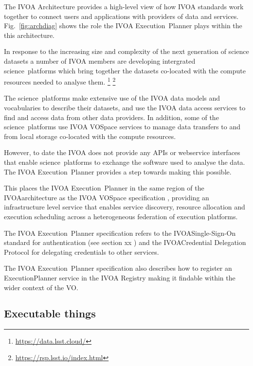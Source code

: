 \documentclass[11pt,a4paper]{ivoa}
\newcommand{\webservice} {webservice}
\newcommand{\ivoa} {IVOA}
\newcommand{\vospace} {VOSpace}
\newcommand{\execplanner} {ExecutionPlanner}
\newcommand{\executionplanner} {Execution~Planner}
\newcommand{\footurl}[1] {\footnote{\url{#1}}}
\newcommand{\dataset} {dataset}
\newcommand{\scienceplatform} {science~platform}
\begin{document}
The IVOA Architecture \citep{2010ivoa.rept.1123A} provides a high-level view of how IVOA
standards work together to connect users and applications with providers of data
and services.
Fig.~\ref{fig:archdiag} shows the role the \ivoa{} \executionplanner{} plays within the this architecture.

In response to the increasing size and complexity of the next generation of science \dataset{}s
a number of \ivoa{} members are developing intergrated \scienceplatform{}s which bring
together the \dataset{}s co-located with the compute resources needed to analyse them.
\footurl{https://data.lsst.cloud/}
\footurl{https://rsp.lsst.io/index.html}

The \scienceplatform{}s make extensive use of the \ivoa{} data models and
vocabularies to describe their \dataset{}s, and use the \ivoa{} data access
services to find and access data from other data providers.
In addition, some of the \scienceplatform{}s use \ivoa{} \vospace{} services to manage
data transfers to and from local storage co-located with the compute resources.

However, to date the \ivoa{} does not provide any APIs or \webservice{} interfaces that
enable \scienceplatform{}s to exchange the software used to analyse the data.
The \ivoa{} \executionplanner{} provides a step towards making this possible.

This places the \ivoa{} \executionplanner{} in the same region of the \ivoa architecture
as the \ivoa{} \vospace{} specification \citep{2009ivoa.specQ1007G},
providing an infrastructure level service that enables service discovery,
resource allocation and execution scheduling across a heterogeneous federation
of execution platforms.

The \ivoa{} \executionplanner{} specification refers to the
\ivoa Single-Sign-On standard \citep{2017ivoa.spec.0524T}
for authentication (see section xx )%
and the
\ivoa Credential Delegation Protocol \citep{2010ivoa.spec.0218P}
for delegating credentials to other services.

The \ivoa{} \executionplanner{} specification also describes how to register
an \execplanner{} service in the
\ivoa{} Registry \citep{2009ivoa.spec.1104B}
making it findable within the wider context of the VO.

\subsection{Executable things}
\label{subsec:executablething}
\end{document}
